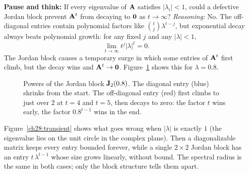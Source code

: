 \begin{recoverybox}
\textbf{Pause and think:} If every eigenvalue of $\mathbf{A}$ satisfies $|\lambda_i| < 1$, could a defective Jordan block prevent $\mathbf{A}^t$ from decaying to $\mathbf{0}$ as $t\to\infty$?
\emph{Reasoning:} No. The off-diagonal entries contain polynomial factors like $\binom{t}{j}\lambda^{t-j}$, but exponential decay always beats polynomial growth: for any fixed $j$ and any $|\lambda| < 1$,
\[
\lim_{t\to\infty} t^j |\lambda|^t = 0.
\]
The Jordan block causes a temporary surge in which some entries of $\mathbf{A}^t$ first climb, but the decay wins and $\mathbf{A}^t \to \mathbf{0}$. Figure~\ref{ch28:hump} shows this for $\lambda=0.8$.
\end{recoverybox}

\begin{figure}[htbp]
\centering
{}
\caption{Powers of the Jordan block $\mathbf{J}_2(0.8)$. The diagonal entry (blue) shrinks
from the start. The off-diagonal entry (red) first climbs to just over $2$ at $t=4$ and $t=5$,
then decays to zero: the factor $t$ wins early, the factor $0.8^{t-1}$ wins in the end.}
\label{ch28:hump}
\end{figure}

Figure~\ref{ch28:transient} shows what goes wrong when $|\lambda|$ is exactly $1$ (the
eigenvalue lies on the unit circle in the complex plane). Then a diagonalizable matrix
keeps every entry bounded forever, while a
single $2\times2$ Jordan block has an entry $t\,\lambda^{t-1}$ whose size grows linearly,
without bound. The spectral radius is the same in both cases; only
the block structure tells them apart.


